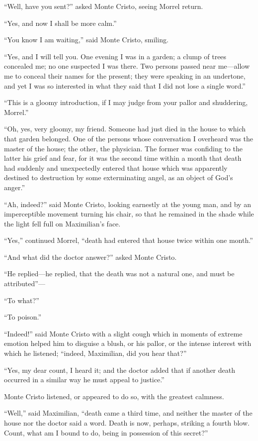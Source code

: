 “Well, have you sent?” asked Monte Cristo, seeing Morrel return.

“Yes, and now I shall be more calm.”

“You know I am waiting,” said Monte Cristo, smiling.

“Yes, and I will tell you. One evening I was in a garden; a clump of
trees concealed me; no one suspected I was there. Two persons passed
near me—allow me to conceal their names for the present; they were
speaking in an undertone, and yet I was so interested in what they said
that I did not lose a single word.”

“This is a gloomy introduction, if I may judge from your pallor and
shuddering, Morrel.”

“Oh, yes, very gloomy, my friend. Someone had just died in the house to
which that garden belonged. One of the persons whose conversation I
overheard was the master of the house; the other, the physician. The
former was confiding to the latter his grief and fear, for it was the
second time within a month that death had suddenly and unexpectedly
entered that house which was apparently destined to destruction by some
exterminating angel, as an object of God’s anger.”

“Ah, indeed?” said Monte Cristo, looking earnestly at the young man,
and by an imperceptible movement turning his chair, so that he remained
in the shade while the light fell full on Maximilian’s face.

“Yes,” continued Morrel, “death had entered that house twice within one
month.”

“And what did the doctor answer?” asked Monte Cristo.

“He replied—he replied, that the death was not a natural one, and must
be attributed”—

“To what?”

“To poison.”

“Indeed!” said Monte Cristo with a slight cough which in moments of
extreme emotion helped him to disguise a blush, or his pallor, or the
intense interest with which he listened; “indeed, Maximilian, did you
hear that?”

“Yes, my dear count, I heard it; and the doctor added that if another
death occurred in a similar way he must appeal to justice.”

Monte Cristo listened, or appeared to do so, with the greatest
calmness.

“Well,” said Maximilian, “death came a third time, and neither the
master of the house nor the doctor said a word. Death is now, perhaps,
striking a fourth blow. Count, what am I bound to do, being in
possession of this secret?”

